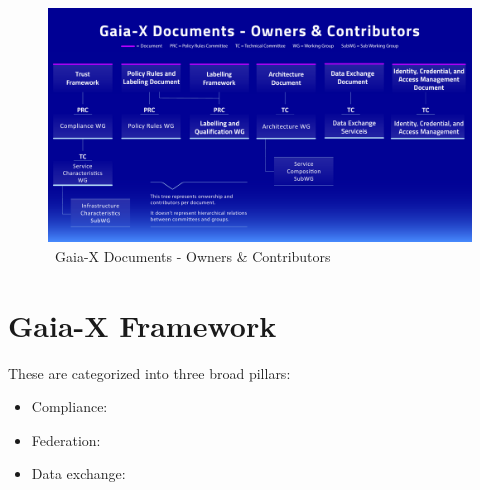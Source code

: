 \begin{figure}
    \centering
    \includegraphics[width=\textwidth]{assets/committees-owners-and-contributors}
    \caption{~Gaia-X Documents - Owners \& Contributors~\cite{gaiax}}\label{fig:gaiax-documents-owners-and-contributors}
\end{figure}


\section{Gaia-X Framework}\label{sec:gaia-x-framework}

These are categorized into three broad pillars: %
\begin{itemize}
    \item Compliance:
    \item Federation:
    \item Data exchange:
\end{itemize}




